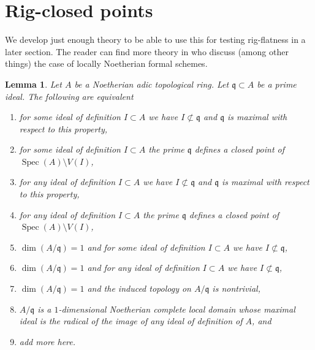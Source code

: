 \documentclass{stacks-project}
\theoremstyle{plain}
\newtheorem{lemma}[subsection]{Lemma}
\theoremstyle{definition}
\theoremstyle{remark}
\numberwithin{equation}{subsection}
\def\Spec{\mathop{\mathrm{Spec}}}
\begin{document}
\section{Rig-closed points}
\label{section-rig-points}

\noindent
We develop just enough theory to be able to use this for testing
rig-flatness in a later section. The reader can find more theory
in \cite{BL-I} who discuss (among other things) the
case of locally Noetherian formal schemes.

\begin{lemma}
\label{lemma-rig-point}
Let $A$ be a Noetherian adic topological ring. Let
$\mathfrak q \subset A$ be a prime ideal. The following are
equivalent
\begin{enumerate}
\item for some ideal of definition $I \subset A$ we have
$I \not \subset \mathfrak q$ and $\mathfrak q$ is maximal
with respect to this property,
\item for some ideal of definition $I \subset A$ the prime
$\mathfrak q$ defines a closed point of $\Spec(A) \setminus V(I)$,
\item for any ideal of definition $I \subset A$ we have
$I \not \subset \mathfrak q$ and $\mathfrak q$ is maximal
with respect to this property,
\item for any ideal of definition $I \subset A$ the prime
$\mathfrak q$ defines a closed point of $\Spec(A) \setminus V(I)$,
\item $\dim(A/\mathfrak q) = 1$ and for some ideal of definition
$I \subset A$ we have $I \not \subset \mathfrak q$,
\item $\dim(A/\mathfrak q) = 1$ and for any ideal of definition
$I \subset A$ we have $I \not \subset \mathfrak q$,
\item $\dim(A/\mathfrak q) = 1$ and the induced topology
on $A/\mathfrak q$ is nontrivial,
\item $A/\mathfrak q$ is a $1$-dimensional Noetherian complete local domain
whose maximal ideal is the radical of the image of any ideal of
definition of $A$, and
\item add more here.
\end{enumerate}
\end{lemma}
\end{document}
